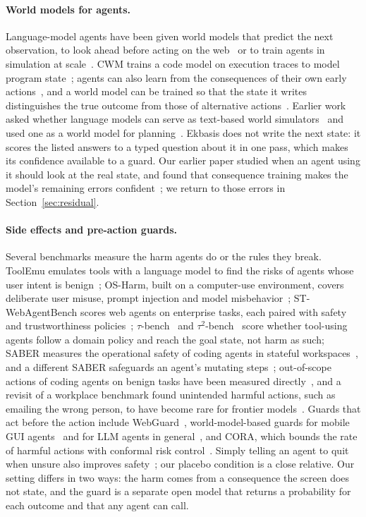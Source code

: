 \documentclass[11pt]{article}
\begin{document}
\paragraph{World models for agents.} Language-model agents have been given world models that predict the next
observation, to look ahead before acting on the web~\cite{chae2025wma,gu2025webdreamer} or to train agents in
simulation at scale~\cite{webworld2026,zuo2026agentworld}. CWM trains a code model on execution traces to model program
state~\cite{cwm2025}; agents can also learn from the consequences of their own early actions~\cite{zhang2025early}, and a
world model can be trained so that the state it writes distinguishes the true outcome from those of alternative
actions~\cite{li2026discriminative}. Earlier work asked whether language models can serve as text-based world
simulators~\cite{wang2024sim} and used one as a world model for planning~\cite{hao2023rap}. Ekbasis does not write the
next state: it scores the listed answers to a typed question about it in one pass, which makes its confidence available
to a guard. Our earlier paper studied when an agent using it should look at the real state, and found that consequence
training makes the model's remaining errors confident~\cite{vicentino2026ekbasis}; we return to those errors in
Section~\ref{sec:residual}.

\paragraph{Side effects and pre-action guards.} Several benchmarks measure the harm agents do or the rules they break.
ToolEmu emulates tools with a language model to find the risks of agents whose user intent is
benign~\cite{ruan2024toolemu}; OS-Harm, built on a computer-use environment, covers deliberate user misuse, prompt
injection and model misbehavior~\cite{kuntz2025osharm}; ST-WebAgentBench scores web agents on enterprise tasks, each
paired with safety and trustworthiness policies~\cite{levy2024stweb}; $\tau$-bench~\cite{yao2024tau} and
$\tau^2$-bench~\cite{barres2025tau2} score whether tool-using agents follow a domain policy and reach the goal state, not
harm as such; SABER measures the operational safety of coding agents in stateful workspaces~\cite{hu2026saber}, and a
different SABER safeguards an agent's mutating steps~\cite{cuadron2025saber}; out-of-scope actions of coding agents on
benign tasks have been measured directly~\cite{overeager2026}, and a revisit of a workplace benchmark found unintended
harmful actions, such as emailing the wrong person, to have become rare for frontier models~\cite{workbenchrev2026}.
Guards that act before the action include WebGuard~\cite{zheng2025webguard}, world-model-based guards for mobile GUI
agents~\cite{yu2026seerguard} and for LLM agents in general~\cite{dreamguard2026}, and CORA, which bounds the rate of
harmful actions with conformal risk control~\cite{cora2026}. Simply telling an agent to quit when unsure also improves
safety~\cite{quitting2025}; our placebo condition is a close relative. Our setting differs in two ways: the harm comes
from a consequence the screen does not state, and the guard is a separate open model that returns a probability for
each outcome and that any agent can call.
\end{document}
